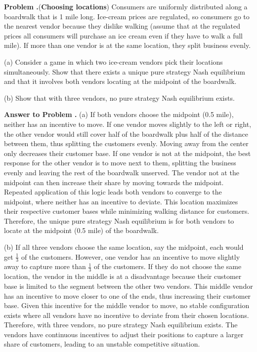 \documentclass[12pt, english]{article}
\newcounter{problemname}
\newcounter{answername}
\newenvironment{problem}{\stepcounter{problemname}\par\noindent\textbf{Problem \arabic{problemname}.}}{\\\par}
\newenvironment{answer}{\stepcounter{answername}\par\noindent\textbf{Answer to Problem \arabic{answername}.\newline}}{\\\par\bigskip}
\begin{document}
\begin{problem}(\textbf{Choosing locations})
	Consumers are uniformly distributed along a boardwalk that is 1 mile long. Ice-cream prices are regulated, so consumers go to the nearest vendor because they dislike walking (assume that at the regulated prices all consumers will purchase an ice cream even if they have to walk a full mile). If more than one vendor is at the same location, they split business evenly.

	\noindent (a) Consider a game in which two ice-cream vendors pick their locations simultaneously. Show that there exists a unique pure strategy Nash equilibrium and that it involves both vendors locating at the midpoint of the boardwalk.

	\noindent (b) Show that with three vendors, no pure strategy Nash equilibrium exists. 
\end{problem}
\begin{answer}
	\noindent (a)
	If both vendors choose the midpoint (0.5 mile), neither has an incentive to move. If one vendor moves slightly to the left or right, the other vendor would still cover half of the boardwalk plus half of the distance between them, thus splitting the customers evenly. Moving away from the center only decreases their customer base.
	If one vendor is not at the midpoint, the best response for the other vendor is to move next to them, splitting the business evenly and leaving the rest of the boardwalk unserved. The vendor not at the midpoint can then increase their share by moving towards the midpoint.
	Repeated application of this logic leads both vendors to converge to the midpoint, where neither has an incentive to deviate. This location maximizes their respective customer bases while minimizing walking distance for customers.
	Therefore, the unique pure strategy Nash equilibrium is for both vendors to locate at the midpoint (0.5 mile) of the boardwalk.
	
	\noindent (b)
	If all three vendors choose the same location, say the midpoint, each would get $\frac{1}{3}$ of the customers. However, one vendor has an incentive to move slightly away to capture more than $\frac{1}{3}$ of the customers.
	If they do not choose the same location, the vendor in the middle is at a disadvantage because their customer base is limited to the segment between the other two vendors. This middle vendor has an incentive to move closer to one of the ends, thus increasing their customer base.
	Given this incentive for the middle vendor to move, no stable configuration exists where all vendors have no incentive to deviate from their chosen locations.
	Therefore, with three vendors, no pure strategy Nash equilibrium exists. The vendors have continuous incentives to adjust their positions to capture a larger share of customers, leading to an unstable competitive situation.
\end{answer}
\end{document}

